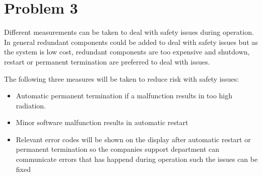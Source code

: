 \chapter{Problem 3}
\label{chp:three}


Different measurements can be taken to deal with safety issues during operation. In general redundant components could be added to deal with safety issues but as the system is low cost, redundant components are too expensive and shutdown, restart or permanent termination are preferred to deal with issues.

The following three measures will be taken to reduce risk with safety issues:

\begin{itemize}
	\item Automatic permanent termination if a malfunction results in too high radiation. 
	\item Minor software malfunction results in automatic restart
	\item Relevant error codes will be shown on the display after automatic restart or permanent termination so the companies support department can communicate errors that has happend during operation such the issues can be fixed
\end{itemize}